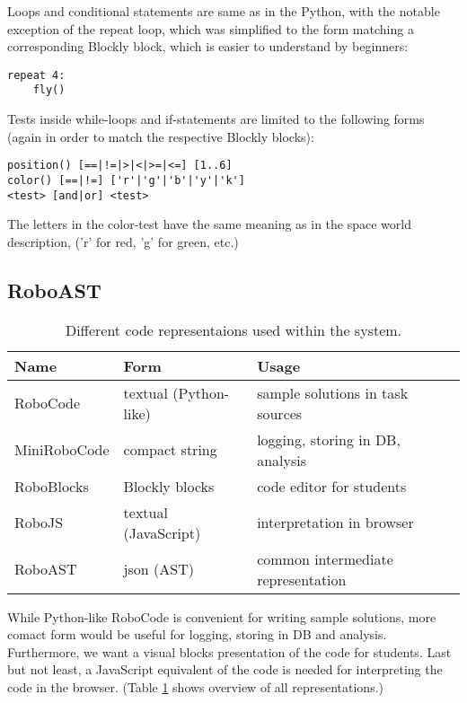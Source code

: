Loops and conditional statements are same as in the Python,
with the notable exception of the repeat loop,
which was simplified to the form matching a corresponding
Blockly block, which is easier to understand by beginners:
\begin{lstlisting}
repeat 4:
    fly()
\end{lstlisting}

Tests inside while-loops and if-statements are limited to the following forms
(again in order to match the respective Blockly blocks):
\begin{lstlisting}
position() [==|!=|>|<|>=|<=] [1..6]
color() [==|!=] ['r'|'g'|'b'|'y'|'k']
<test> [and|or] <test>
\end{lstlisting}
The letters in the color-test have the same meaning as in the space world description,
('r' for red, 'g' for green, etc.)


\subsection{RoboAST}

\begin{table}[h]
\begin{center}
\begin{tabular}{l l l}
\toprule
Name & Form & Usage  \\
\midrule
RoboCode     & textual (Python-like) & sample solutions in task sources  \\
MiniRoboCode & compact string & logging, storing in DB, analysis  \\
RoboBlocks   & Blockly blocks & code editor for students  \\
RoboJS       & textual (JavaScript) & interpretation in browser  \\
RoboAST      & json (AST) & common intermediate representation \\
\bottomrule
\end{tabular}
\end{center}
\caption{Different code representaions used within the system.}
\label{tbl:code-representation}
\end{table}

While Python-like RoboCode is convenient for writing sample solutions,
more comact form would be useful for logging, storing in DB and analysis.
Furthermore, we want a visual blocks presentation of the code for students.
Last but not least, a JavaScript equivalent of the code is needed for
interpreting the code in the browser.
(Table \ref{tbl:code-representation} shows overview of all representations.)

